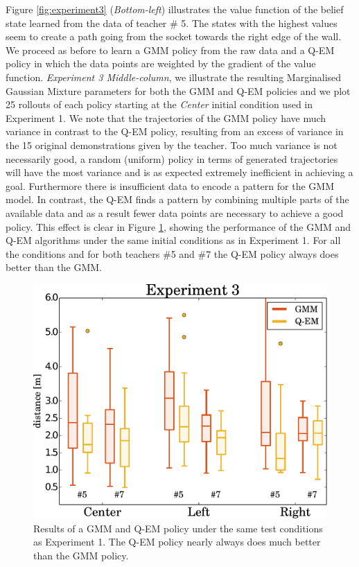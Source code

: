 \documentclass[final,3p,times,twocolumn]{elsarticle}
\begin{document}
Figure \ref{fig:experiment3} (\textit{Bottom-left}) illustrates the value function of the belief state learned from the data of teacher \# 5.
The states with the highest values seem to create a path going from the socket towards the right edge of the wall. 
We proceed as before to learn a GMM policy from the raw data and a Q-EM policy in which the data points are weighted by 
the gradient of the value function. \textit{Experiment 3 Middle-column}, we illustrate the 
resulting Marginalised Gaussian Mixture parameters for both the GMM and Q-EM policies and we plot 25 rollouts of each policy starting at 
the \textit{Center} initial condition used in Experiment 1. We note that the trajectories of the GMM 
policy have much variance in contrast to the Q-EM policy, resulting from an excess of variance in the 15 original demonstrations
given by the teacher. Too much variance is not necessarily good, a random (uniform) policy in terms of generated trajectories
will have the most variance and is as expected extremely inefficient in achieving a goal. Furthermore there is insufficient data to encode a pattern for the GMM model. In contrast, the Q-EM finds a 
pattern by combining multiple parts of the available data and as a result fewer data points are necessary to achieve a good policy. 
This effect is clear in Figure \ref{fig:experiment3_stats}, showing the performance of the GMM and Q-EM algorithms 
under the same initial conditions as in Experiment 1. For all the conditions and for both teachers \#5 and \#7 the Q-EM policy 
always does better than the GMM.

\begin{figure}
 \centering
 \includegraphics[width=\linewidth]{./Figure/experiment3_stats.pdf}
 \caption{Results of a GMM and Q-EM policy under the same test conditions as Experiment 1. The Q-EM policy nearly always does much better than the GMM policy.}
 \label{fig:experiment3_stats}
\end{figure}
\end{document}
